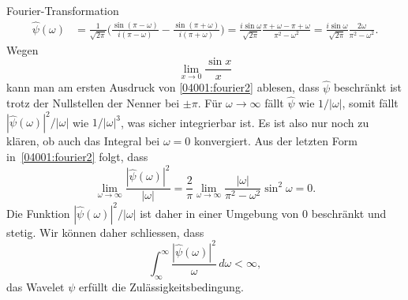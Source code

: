 \begin{loesung}
\begin{teilaufgaben}
Fourier-Transformation
\begin{align}
\hat{\psi}(\omega)
&=
\frac{1}{\sqrt{2\pi}}
\biggl(
\frac{\sin(\pi-\omega)}{i(\pi-\omega)}
-
\frac{\sin(\pi+\omega)}{i(\pi+\omega)}
\biggr)
=
\frac{i\sin\omega}{\sqrt{2\pi}}
\frac{\pi+\omega-\pi+\omega}{\pi^2-\omega^2}
=
\frac{i\sin\omega}{\sqrt{2\pi}}
\frac{2\omega}{\pi^2-\omega^2}.
\label{04001:fourier2}
\end{align}
Wegen 
\[
\lim_{x\to 0}\frac{\sin x}{x}
\]
kann man am ersten Ausdruck von \eqref{04001:fourier2} ablesen,
dass $\hat{\psi}$ beschränkt ist trotz der Nullstellen der Nenner
bei $\pm \pi$.
Für $\omega\to\infty$ fällt $\hat{\psi}$ wie $1/|\omega|$, somit fällt
$|\hat{\psi}(\omega)|^2/|\omega|$ wie $1/|\omega|^3$, was sicher
integrierbar ist.
Es ist also nur noch zu klären, ob auch das Integral bei $\omega=0$
konvergiert.
Aus der letzten Form in~\eqref{04001:fourier2} folgt, dass
\[
\lim_{\omega\to\infty} \frac{|\hat{\psi}(\omega)|^2}{|\omega|}
=
\frac{2}{\pi}
\lim_{\omega\to\infty} \frac{|\omega|}{\pi^2-\omega^2}\sin^2\omega
=
0.
\]
Die Funktion $|\hat{\psi}(\omega)|^2/|\omega|$ ist daher in einer
Umgebung von $0$ beschränkt und stetig.
Wir können daher schliessen, dass
\[
\int_{\infty}^\infty\frac{|\hat{\psi}(\omega)|^2}{\omega}\,d\omega < \infty,
\]
das Wavelet $\psi$ erfüllt die Zulässigkeitsbedingung.
\qedhere
\end{teilaufgaben}
\end{loesung}
